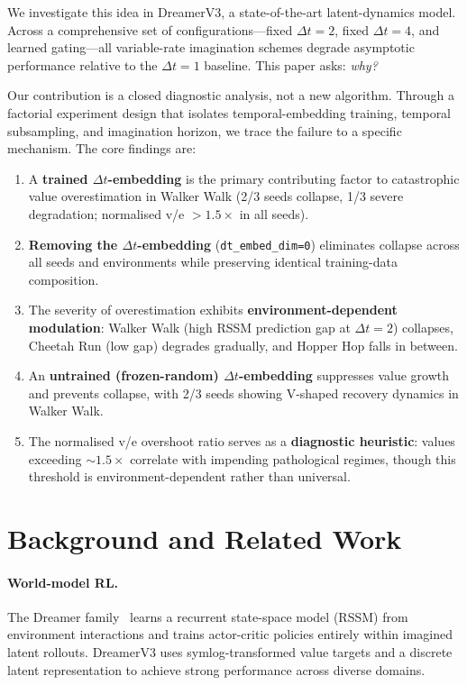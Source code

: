 \documentclass[letterpaper]{article}
\begin{document}
We investigate this idea in DreamerV3, a state-of-the-art latent-dynamics model.
Across a comprehensive set of configurations---fixed $\Delta t{=}2$, fixed $\Delta t{=}4$, and learned gating---all variable-rate imagination schemes degrade asymptotic performance relative to the $\Delta t{=}1$ baseline.
This paper asks: \emph{why?}

Our contribution is a closed diagnostic analysis, not a new algorithm.
Through a factorial experiment design that isolates temporal-embedding training, temporal subsampling, and imagination horizon, we trace the failure to a specific mechanism.
The core findings are:

\begin{enumerate}[leftmargin=*,nosep]
    \item A \textbf{trained $\Delta t$-embedding} is the primary contributing factor to catastrophic value overestimation in Walker Walk (2/3 seeds collapse, 1/3 severe degradation; normalised v/e $>1.5\times$ in all seeds).
    \item \textbf{Removing the $\Delta t$-embedding} (\texttt{dt\_embed\_dim=0}) eliminates collapse across all seeds and environments while preserving identical training-data composition.
    \item The severity of overestimation exhibits \textbf{environment-dependent modulation}: Walker Walk (high RSSM prediction gap at $\Delta t{=}2$) collapses, Cheetah Run (low gap) degrades gradually, and Hopper Hop falls in between.
    \item An \textbf{untrained (frozen-random) $\Delta t$-embedding} suppresses value growth and prevents collapse, with 2/3 seeds showing V-shaped recovery dynamics in Walker Walk.
    \item The normalised v/e overshoot ratio serves as a \textbf{diagnostic heuristic}: values exceeding ${\sim}1.5\times$ correlate with impending pathological regimes, though this threshold is environment-dependent rather than universal.
\end{enumerate}

\section{Background and Related Work}

\paragraph{World-model RL.}
The Dreamer family~\cite{hafner2020dreamerv1,hafner2023dreamerv3} learns a recurrent state-space model (RSSM) from environment interactions and trains actor-critic policies entirely within imagined latent rollouts.
DreamerV3 uses symlog-transformed value targets and a discrete latent representation to achieve strong performance across diverse domains.
\end{document}
